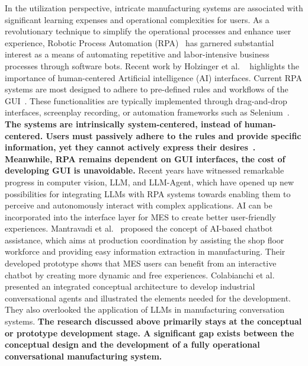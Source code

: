 \documentclass[preprint,12pt]{elsarticle}
\begin{document}
In the utilization perspective, intricate manufacturing systems are associated with significant learning expenses and operational complexities for users.
As a revolutionary technique to simplify the operational processes and enhance user experience, Robotic Process Automation (RPA)~\cite{siderska2020robotic} has garnered substantial interest as a means of automating repetitive and labor-intensive business processes through software bots.
Recent work by Holzinger et al. ~\cite{holzinger2022personas} highlights the importance of human-centered Artificial intelligence (AI) interfaces.
Current RPA systems are most designed to adhere to pre-defined rules and workflows of the GUI~\cite{jain2024smartflow}.
These functionalities are typically implemented through drag-and-drop interfaces, screenplay recording, or automation frameworks such as Selenium~\cite{sharma2014web}.
\textbf{The systems are intrinsically system-centered, instead of human-centered.
Users must passively adhere to the rules and provide specific information, yet they cannot actively express their desires~\cite{jain2024smartflow}.
Meanwhile, RPA remains dependent on GUI interfaces, the cost of developing GUI is unavoidable.}
Recent years have witnessed remarkable progress in computer vision, LLM, and LLM-Agent, which have opened up new possibilities for integrating LLMs with RPA systems towards enabling them to perceive and autonomously interact with complex applications.
AI can be incorporated into the interface layer for MES to create better user-friendly experiences. 
Mantravadi et al.~\cite{mantravadi2020user} proposed the concept of AI-based chatbot assistance, which aims at production coordination by assisting the shop floor workforce and providing easy information
extraction in manufacturing.
Their developed prototype shows that MES users can benefit from an interactive chatbot by creating more dynamic and free experiences.
Colabianchi et al.~\cite{colabianchi2023human} presented an integrated conceptual architecture to develop industrial conversational agents and illustrated the elements needed for the development. 
They also overlooked the application of LLMs in manufacturing conversation systems.
\textbf{The research discussed above primarily stays at the conceptual or prototype development stage. 
A significant gap exists between the conceptual design and the development of a fully operational conversational manufacturing system.}
\end{document}
